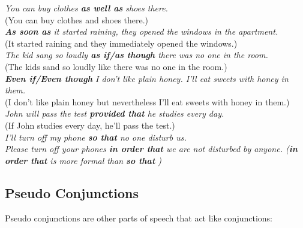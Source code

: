 \documentclass[hidelinks,10pt,a4paper]{article}
\begin{document}
\begin{center}
	\textit{You can buy clothes \textbf{as well as} shoes there.}\\
	(You can buy clothes and shoes there.)\\ \vspace{0.3cm}
	\textit{\textbf{As soon as} it started raining, they opened the windows in the apartment.}\\
	(It started raining and they immediately opened the windows.)\\ \vspace{0.3cm}
	\textit{The kid sang so loudly \textbf{as if/as though} there was no one in the room.}\\
	(The kids sand so loudly like there was no one in the room.)\\ \vspace{0.3cm}
	\textit{\textbf{Even if/Even though} I don't like plain honey. I'll eat sweets with honey in them.}\\
	(I don't like plain honey but nevertheless I'll eat sweets with honey in them.)\\ \vspace{0.3cm}
	\textit{John will pass the test \textbf{provided that} he studies every day.}\\
	(If John studies every day, he'll pass the test.)\\ \vspace{0.3cm}
	\textit{I'll turn off my phone \textbf{so that} no one disturb us.} \\ \vspace{0.3cm}
	\textit{Please turn off your phones \textbf{in order that} we are not disturbed by anyone. (\textbf{in order that} is more formal than \textbf{so that} )}
\end{center}

\subsection{Pseudo Conjunctions}
Pseudo conjunctions are other parts of speech that act like conjunctions:
\end{document}
